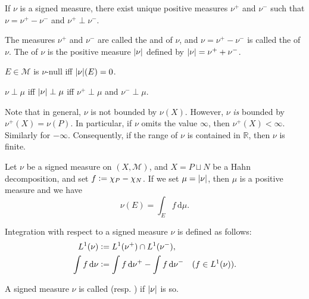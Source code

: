 \documentclass[12pt]{article}	%
\begin{document}
\begin{thm}
	If $\nu$ is a signed measure, there exist unique positive measures $\nu^{+}$ and $\nu^{-}$ such that $\nu = \nu^{+} - \nu^{-}$ and $\nu^{+} \perp \nu^{-}$.
\end{thm}

The measures $\nu^{+}$ and $\nu^{-}$ are called the  and  of $\nu$, and $\nu = \nu^{+} - \nu^{-}$ is called the  of $\nu$. The  of $\nu$ is the positive measure ${\left\lvert \nu \right\lvert}$ defined by ${\left\lvert \nu \right\lvert} = \nu^{+} + \nu^{-}$.

\begin{exe}
	$E \in \mathcal{M}$ is $\nu$-null iff ${\left\lvert \nu \right\lvert}(E) = 0$.

	$\nu \perp \mu$ iff ${\left\lvert \nu \right\lvert} \perp \mu$ iff $\nu^{+} \perp \mu$ and $\nu^{-} \perp \mu$.
\end{exe}

\begin{obs}
	Note that in general, $\nu$ is not bounded by $\nu(X)$. However, $\nu$ \emph{is} bounded by $\nu^{+}(X) = \nu(P)$. In particular, if $\nu$ omits the value $\infty$, then $\nu^{+}(X) < \infty$. Similarly for $-\infty$. \newline
	Consequently, if the range of $\nu$ is contained in $\mathbb{R}$, then $\nu$ is finite.
\end{obs}

\begin{obs}
	Let $\nu$ be a signed measure on $(X, \mathcal{M})$, and $X = P \sqcup N$ be a Hahn decomposition, and set $f \vcentcolon= \chi_{P} - \chi_{N}$. If we set $\mu = {\left\lvert \nu \right\lvert}$, then $\mu$ is a positive measure and we have
	\begin{equation*} 
		\nu(E) = \int_{E} f \,{\mathrm{d}}\mu.
	\end{equation*}
\end{obs}

Integration with respect to a signed measure $\nu$ is defined as follows:
\begin{align*} 
	L^{1}(\nu) &\vcentcolon= L^{1}(\nu^{+}) \cap L^{1}(\nu^{-}), \\
	\int f \,{\mathrm{d}}\nu &\vcentcolon= \int f \,{\mathrm{d}}\nu^{+} - \int f \,{\mathrm{d}}\nu^{-} \quad (f \in L^{1}(\nu)).
\end{align*}

A signed measure $\nu$ is called  (resp. ) if ${\left\lvert \nu \right\lvert}$ is so.
\end{document}
